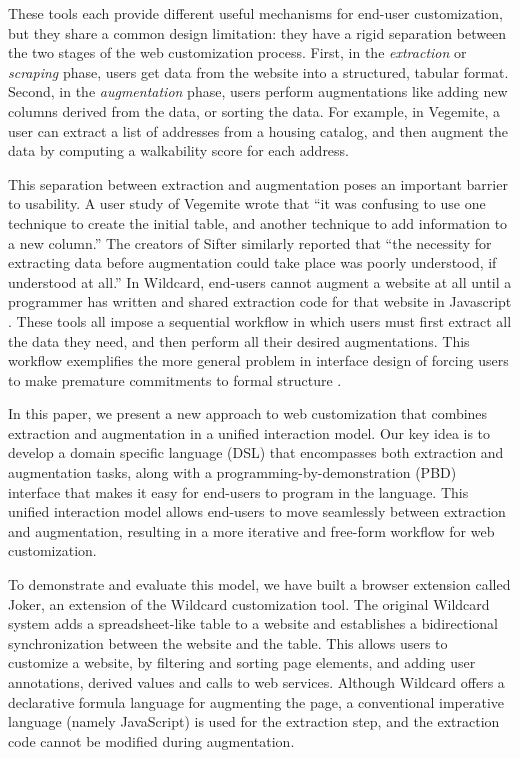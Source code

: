 \documentclass[conference]{IEEEtran}
\begin{document}
These tools each provide different useful mechanisms for end-user
customization, but they share a common design limitation: they have a
rigid separation between the two stages of the web customization
process. First, in the \emph{extraction} or \emph{scraping} phase, users
get data from the website into a structured, tabular format. Second, in
the \emph{augmentation} phase, users perform augmentations like adding
new columns derived from the data, or sorting the data. For example, in
Vegemite, a user can extract a list of addresses from a housing catalog,
and then augment the data by computing a walkability score for each
address.

This separation between extraction and augmentation poses an important
barrier to usability. A user study \citep{lin2009} of Vegemite wrote
that ``it was confusing to use one technique to create the initial
table, and another technique to add information to a new column.'' The
creators of Sifter similarly reported \citep{huynh2006} that ``the
necessity for extracting data before augmentation could take place was
poorly understood, if understood at all.'' In Wildcard, end-users cannot
augment a website at all until a programmer has written and shared
extraction code for that website in Javascript \citep{litt2020}. These
tools all impose a sequential workflow in which users must first extract
all the data they need, and then perform all their desired
augmentations. This workflow exemplifies the more general problem in
interface design of forcing users to make premature commitments to
formal structure \citep{shipman1999, blackwell2001}.

In this paper, we present a new approach to web customization that
combines extraction and augmentation in a unified interaction model. Our
key idea is to develop a domain specific language (DSL) that encompasses
both extraction and augmentation tasks, along with a
programming-by-demonstration (PBD) interface that makes it easy for
end-users to program in the language. This unified interaction model
allows end-users to move seamlessly between extraction and augmentation,
resulting in a more iterative and free-form workflow for web
customization.

To demonstrate and evaluate this model, we have built a browser
extension called Joker, an extension of the Wildcard customization tool.
The original Wildcard system \citep{litt2020} adds a spreadsheet-like
table to a website and establishes a bidirectional synchronization
between the website and the table. This allows users to customize a
website, by filtering and sorting page elements, and adding user
annotations, derived values and calls to web services. Although Wildcard
offers a declarative formula language for augmenting the page, a
conventional imperative language (namely JavaScript) is used for the
extraction step, and the extraction code cannot be modified during
augmentation.
\end{document}
